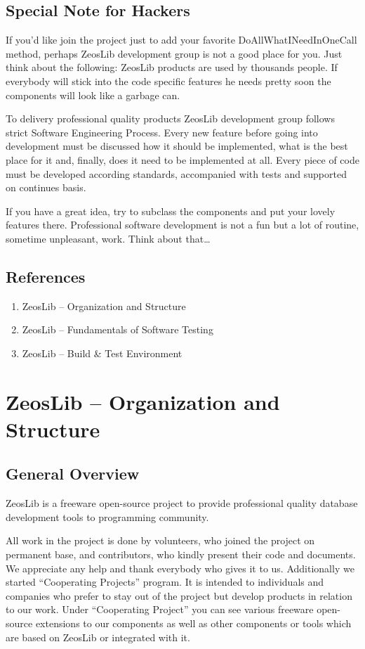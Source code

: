 \documentclass[a4paper,12pt,oneside]{book}
\begin{document}
\section{Special Note for Hackers}
If you’d like join the project just to add your favorite DoAllWhatINeedInOneCall method, perhaps ZeosLib development group is not a good place for you.
Just think about the following: ZeosLib products are used by thousands people.
If everybody will stick into the code specific features he needs pretty soon the components will look like a garbage can. 

To delivery professional quality products ZeosLib development group follows strict Software Engineering Process.
Every new feature before going into development must be discussed how it should be implemented, what is the best place for it and, finally, does it need to be implemented at all.
Every piece of code must be developed according standards, accompanied with tests and supported on continues basis. 

If you have a great idea, try to subclass the components and put your lovely features there.
Professional software development is not a fun but a lot of routine, sometime unpleasant, work. Think about that…

\section{References}
\begin{enumerate}
  \item ZeosLib – Organization and Structure
  \item ZeosLib – Fundamentals of Software Testing
  \item ZeosLib – Build \& Test Environment
\end{enumerate}

\chapter{ZeosLib – Organization and Structure}

\section{General Overview}

ZeosLib is a freeware open-source project to provide professional quality database development tools to programming community. 

All work in the project is done by volunteers, who joined the project on permanent base, and contributors, who kindly present their code and documents.
We appreciate any help and thank everybody who gives it to us.
Additionally we started “Cooperating Projects” program.
It is intended to individuals and companies who prefer to stay out of the project but develop products in relation to our work.
Under “Cooperating Project” you can see various freeware open-source extensions to our components as well as other components or tools which are based on ZeosLib or integrated with it.
\end{document}
